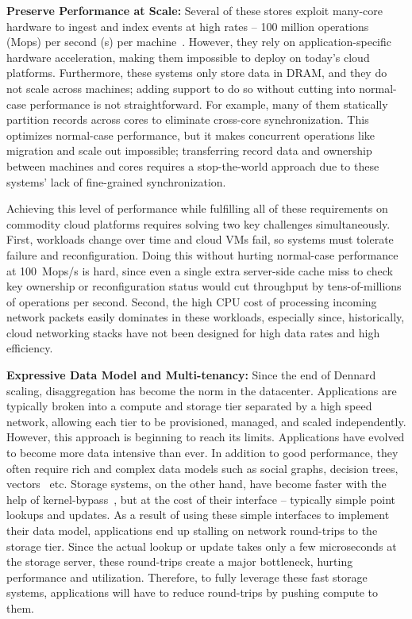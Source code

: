 \textbf{Preserve Performance at Scale:}
Several of these stores exploit many-core hardware to
ingest and index events at high rates -- 100 million operations
(Mops) per second (s) per machine~\cite{mica,flexnic,floem,kvdirect}.
%
However, they rely on application-specific
hardware acceleration, making them impossible to deploy on today's cloud
platforms.
%
Furthermore, these systems only store data in DRAM, and they do not scale across
machines; adding support to do so without cutting into normal-case performance
is not straightforward.
%
For example, many of them statically partition records across cores to
eliminate cross-core synchronization.
%
This optimizes normal-case performance, but it makes concurrent
operations like migration and scale out impossible; transferring record data
and ownership between machines and cores requires a stop-the-world approach
due to these systems' lack of fine-grained synchronization.

Achieving this level of performance while fulfilling all of these
requirements on commodity cloud platforms requires solving two key challenges
simultaneously.
%
First, workloads change over time and cloud VMs fail, so systems must tolerate
failure and reconfiguration.
%
Doing this without hurting normal-case performance at 100~Mops/s is hard, since
even a single extra server-side cache miss to check key ownership or
reconfiguration status would cut throughput by tens-of-millions of operations
per second.
%
Second, the high CPU cost of processing incoming network
packets easily dominates in these workloads,
especially since, historically, cloud networking stacks have not been designed
for high data rates and high efficiency.

\textbf{Expressive Data Model and Multi-tenancy:}
Since the end of Dennard scaling, disaggregation has become the norm in
the datacenter.
%
Applications are typically broken into a compute and
storage tier separated by a high speed network, allowing each tier to be
provisioned, managed, and scaled independently.
%
However, this approach
is beginning to reach its limits.
%
Applications have evolved to become more data intensive than ever.
%
In addition to good performance, they often require rich and complex
data models such as social graphs, decision trees,
vectors~\cite{fb-memcache,parameter-server} etc.
%
Storage systems, on the other hand, have become faster with the help of
kernel-bypass~\cite{ramcloud,farm-txns}, but at the cost of their
interface – typically simple point lookups and updates.
%
As a result of using these simple interfaces to implement their data
model, applications end up stalling on network round-trips to the
storage tier.
%
Since the actual lookup or update takes only a few
microseconds at the storage server, these round-trips create a major
bottleneck, hurting performance and utilization.
%
Therefore, to fully
leverage these fast storage systems, applications will have to reduce
round-trips by pushing compute to them.

